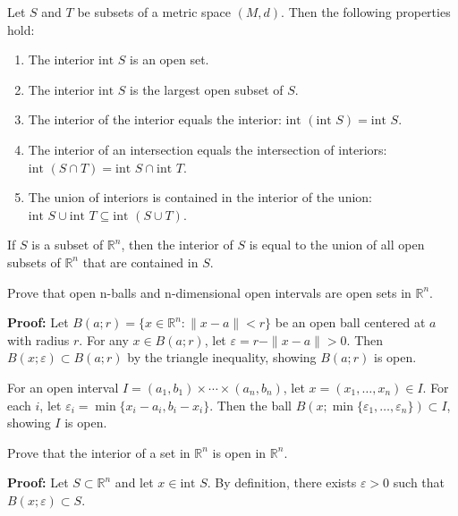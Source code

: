 \begin{theorem}
Let $S$ and $T$ be subsets of a metric space $(M,d)$. Then the following properties hold:
\begin{enumerate}
\item The interior $\text{int } S$ is an open set.
\item The interior $\text{int } S$ is the largest open subset of $S$.
\item The interior of the interior equals the interior: $\text{int }(\text{int } S) = \text{int } S$.
\item The interior of an intersection equals the intersection of interiors: $\text{int }(S \cap T) = \text{int } S \cap \text{int } T$.
\item The union of interiors is contained in the interior of the union: $\text{int } S \cup \text{int } T \subseteq \text{int }(S \cup T)$.
\end{enumerate}
\end{theorem}

\begin{theorem}
If $S$ is a subset of $\mathbb{R}^n$, then the interior of $S$ is equal to the union of all open subsets of $\mathbb{R}^n$ that are contained in $S$.
\end{theorem}

\begin{problembox}
Prove that open n-balls and n-dimensional open intervals are open sets in $\mathbb{R}^n$.
\end{problembox}

\textbf{Proof:} Let $B(a;r) = \{x \in \mathbb{R}^n : \|x-a\| < r\}$ be an open ball centered at $a$ with radius $r$. For any $x \in B(a;r)$, let $\varepsilon = r - \|x-a\| > 0$. Then $B(x;\varepsilon) \subset B(a;r)$ by the triangle inequality, showing $B(a;r)$ is open.

For an open interval $I = (a_1,b_1) \times \cdots \times (a_n,b_n)$, let $x = (x_1,\ldots,x_n) \in I$. For each $i$, let $\varepsilon_i = \min\{x_i - a_i, b_i - x_i\}$. Then the ball $B(x;\min\{\varepsilon_1,\ldots,\varepsilon_n\}) \subset I$, showing $I$ is open.

\begin{problembox}
Prove that the interior of a set in $\mathbb{R}^n$ is open in $\mathbb{R}^n$.
\end{problembox}

\textbf{Proof:} Let $S \subset \mathbb{R}^n$ and let $x \in \text{int } S$. By definition, there exists $\varepsilon > 0$ such that $B(x;\varepsilon) \subset S$.

